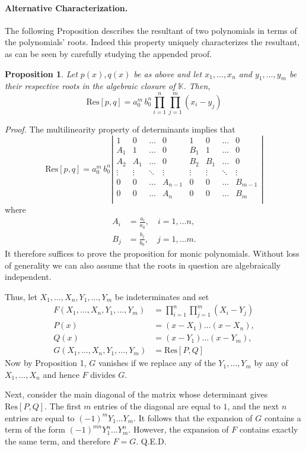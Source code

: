 \documentclass[12pt]{article}
\newcommand{\kfield}{\mathbb{K}}
\newcommand{\Res}{\mathrm{Res}}
\newcommand{\ha}{A}
\newcommand{\hb}{B}
\newtheorem{proposition}{Proposition}
\begin{document}
\paragraph{Alternative Characterization.}
The following Proposition describes the resultant of two polynomials
in terms of the polynomials' roots.  Indeed this property uniquely
characterizes the resultant, as can be seen by carefully studying the
appended proof.
\begin{proposition}
  Let $p(x), q(x)$ be as above and let $x_1,\ldots,x_n$ and
  $y_1,\ldots,y_m$ be their respective roots in the algebraic closure
  of $\kfield$.  Then,
  $$\Res[p,q] = a_0^m\, b_0^n \prod_{i=1}^n \prod_{j=1}^m (x_i-y_j)$$
\end{proposition}
{\em Proof.}  The multilinearity property of determinants implies that
$$\Res[p,q] = a_0^m\, b_0^n
 \left | 
  \begin{array}{cccccccc}
    1 & 0 &  \ldots &  0 & 1 & 0 & \ldots & 0 \\
    \ha_1 & 1  & \ldots & 0 & \hb_1 & 1 & \ldots & 0 \\
    \ha_2 & \ha_1 & \ldots  & 0 & \hb_2 & \hb_1 & \ldots & 0\\
    \vdots & \vdots  & \ddots & \vdots  &\vdots  &\vdots 
    &\ddots & \vdots \\
    0 & 0 &  \ldots  & \ha_{n-1} & 0 & 0 &\ldots & \hb_{m-1} \\
    0 & 0 &  \ldots  & \ha_n & 0 & 0 &\ldots & \hb_m \\
  \end{array}
\right|$$
where
\begin{align*}
A_i &= \frac{a_i}{a_0},\quad i=1,\ldots n,\\
B_j &= \frac{b_j}{b_0},\quad j=1,\ldots m.
\end{align*}
It therefore suffices to prove the proposition for monic polynomials.
Without loss of generality we can also assume that the roots in
question are algebraically independent.

Thus, let $X_1,\ldots,X_n, Y_1,\ldots,Y_m$ be indeterminates and set
\begin{align*}
F(X_1,\ldots,X_n, Y_1,\ldots,Y_m) &= \prod_{i=1}^n \prod_{j=1}^m
(X_i-Y_j)\\
P(x)&=(x-X_1)\ldots (x-X_n),\\
Q(x) &= (x-Y_1)\ldots (x-Y_m),\\
G(X_1,\ldots,X_n, Y_1,\ldots,Y_m) &= \Res[P,Q]
\end{align*}
Now by Proposition 1, $G$ vanishes if we replace any of the
$Y_1,\ldots,Y_m$ by any of $X_1,\ldots,X_n$ and hence $F$ divides $G$.

Next, consider the main diagonal of the matrix whose determinant gives
$\Res[P,Q]$. The first $m$ entries of the diagonal are equal to $1$,
and the next $n$ entries are equal to $(-1)^m Y_1\ldots Y_m$.  It
follows that the expansion of $G$ contains a term of the form
$(-1)^{mn} Y_1^n\ldots Y_m^n$.  However, the expansion of $F$ contains
exactly the same term, and therefore $F=G$.  Q.E.D.
\end{document}
